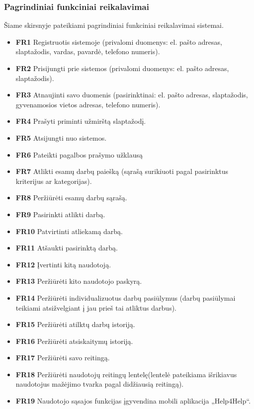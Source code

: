 \documentclass{VUMIFPSbakalaurinis}
\begin{document}
\subsubsection{Pagrindiniai funkciniai reikalavimai}
Šiame skirsnyje pateikiami pagrindiniai funkciniai reikalavimai sistemai.
\begin{itemize}
	\item \textbf{FR1} Registruotis sistemoje (privalomi duomenys: el. pašto adresas, slaptažodis, vardas, pavardė, telefono numeris).
	\item \textbf{FR2} Prisijungti prie sistemos (privalomi duomenys: el. pašto adresas, slaptažodis).
	\item \textbf{FR3} Atnaujinti savo duomenis (pasirinktinai: el. pašto adresas, slaptažodis, gyvenamosios vietos adresas, telefono numeris).
	\item \textbf{FR4} Prašyti priminti užmirštą slaptažodį.
	\item \textbf{FR5} Atsijungti nuo sistemos.
	\item \textbf{FR6} Pateikti pagalbos prašymo užklausą
	\item \textbf{FR7} Atlikti esamų darbų paiešką (sąrašą surikiuoti pagal pasirinktus kriterijus ar kategorijas).
	\item \textbf{FR8} Peržiūrėti esamų darbų sąrašą.
	\item \textbf{FR9} Pasirinkti atlikti darbą.
	\item \textbf{FR10} Patvirtinti atliekamą darbą.
	\item \textbf{FR11} Atšaukti pasirinktą darbą.
	\item \textbf{FR12} Įvertinti kitą naudotoją.
	\item \textbf{FR13} Peržiūrėti kito naudotojo paskyrą.
	\item \textbf{FR14} Peržiūrėti individualizuotus darbų pasiūlymus (darbų pasiūlymai teikiami atsižvelgiant į jau prieš tai atliktus darbus).
	\item \textbf{FR15} Peržiūrėti atilktų darbų istoriją.
	\item \textbf{FR16} Peržiūrėti atsiskaitymų istoriją.
	\item \textbf{FR17} Peržiūrėti savo reitingą.
	\item \textbf{FR18} Peržiūrėti naudotojų reitingų lentelę(lentelė pateikiama išrikiavus naudotojus mažėjimo tvarka pagal didžiausią reitingą).
	\item \textbf{FR19} Naudotojo sąsajos funkcijas įgyvendina mobili aplikacija „Help4Help“.
\end{itemize}
\end{document}
